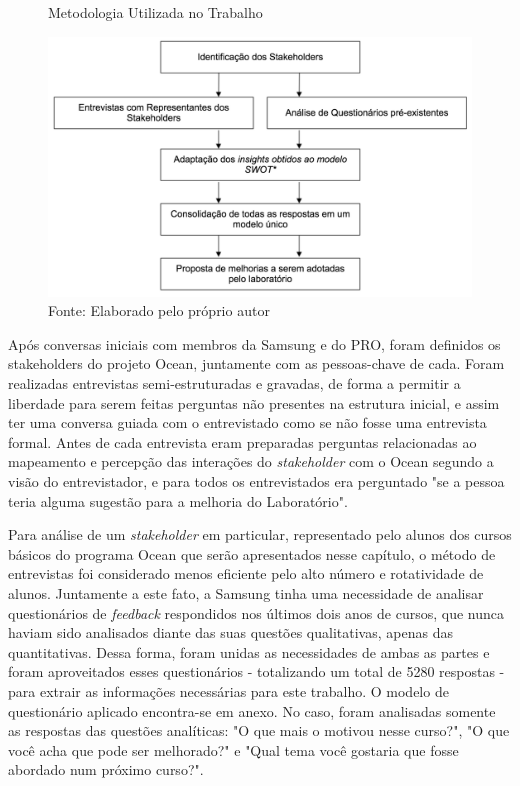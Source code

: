 \label{chap:metodologia}

\begin{figure}[h]
\caption{Metodologia Utilizada no Trabalho}
\centerline{\includegraphics[scale=0.5]{img/metodologia}}
\label{fig:metodologia}
\caption* {Fonte: Elaborado pelo próprio autor}
\end{figure}

Após conversas iniciais com membros da Samsung e do PRO, foram definidos os stakeholders do projeto Ocean, juntamente com as pessoas-chave de cada. Foram realizadas entrevistas semi-estruturadas e gravadas, de forma a permitir a liberdade para serem feitas perguntas não presentes na estrutura inicial, e assim ter uma conversa guiada com o entrevistado como se não fosse uma entrevista formal. Antes de cada entrevista eram preparadas perguntas relacionadas ao mapeamento e percepção das interações do \textit{stakeholder} com o Ocean segundo a visão do entrevistador, e para todos os entrevistados era perguntado "se a pessoa teria alguma sugestão para a melhoria do Laboratório".

Para análise de um \textit{stakeholder} em particular, representado pelo alunos dos cursos básicos do programa Ocean que serão apresentados nesse capítulo, o método de entrevistas foi considerado menos eficiente pelo alto número e rotatividade de alunos. Juntamente a este fato, a Samsung tinha uma necessidade de analisar questionários de \textit{feedback} respondidos nos últimos dois anos de cursos, que nunca haviam sido analisados diante das suas questões qualitativas, apenas das quantitativas. Dessa forma, foram unidas as necessidades de ambas as partes e foram aproveitados esses questionários - totalizando um total de 5280 respostas - para extrair as informações necessárias para este trabalho. O modelo de questionário aplicado encontra-se em anexo. No caso, foram analisadas somente as respostas das questões analíticas: "O que mais o motivou nesse curso?", "O que você acha que pode ser melhorado?" e "Qual tema você gostaria que fosse abordado num próximo curso?".

